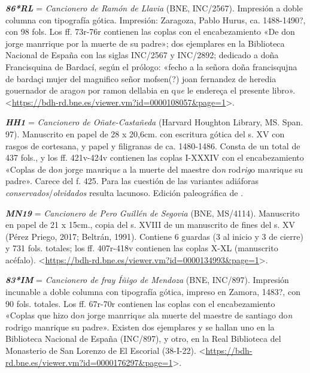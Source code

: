 \documentclass[11pt]{article}
\newcommand{\rl}{\emph{\textbf{86*RL}}}
\newcommand{\hh}{\emph{\textbf{HH1}}}
\newcommand{\mn}{\emph{\textbf{MN19}}}
\newcommand{\im}{\emph{\textbf{83*IM}}}
\newcommand{\comillas}[1]{«#1»}
\begin{document}
%
{\rl} = \emph{Cancionero de Ramón de Llavia} (BNE, INC/2567).
%
Impresión a doble columna con tipografía gótica. Impresión: Zaragoza, Pablo Hurus, ca. 1488-1490?, con 98 fols. Los ff. 73r-76r contienen las coplas con el encabezamiento \comillas{De don jorge manrrique por la muerte de su padre}; dos ejemplares en la Biblioteca Nacional de España con las siglas INC/2567 y INC/2892; dedicado a doña Francisquina de Bardací, según el prólogo: \comillas{fecho a la señora doña francisqujna de bardaçi mujer del magnifico señor mofsen(?) joan fernandez de heredia gouernador de arago\emph{n} por ramon dellabia en q\emph{ue} le endereça el presente libro}. <\url{https://bdh-rd.bne.es/viewer.vm?id=0000108057\&page=1}>.\par
%
{\hh} = \emph{Cancionero de Oñate-Castañeda} (Harvard Houghton Library, MS. Span. 97).
%
Manuscrito en papel de 28 x 20,6cm. con escritura gótica del s. XV con rasgos de cortesana, y papel y filigranas de ca. 1480-1486. Consta de un total de 437 fols., y los ff. 421v-424v contienen las coplas I-XXXIV con el encabezamiento \comillas{Coplas de do\emph{n} jorge ma\emph{n}riq\emph{ue} a la muerte del maestre do\emph{n} rod\emph{rig}o ma\emph{n}riq\emph{ue} su padre}. Carece del f. 425. Para las cuestión de las variantes adiáforas \emph{conservados}/\emph{olvidados} resulta lacunoso. Edición paleográfica de \textcite{Severin1990}.\par
%
{\mn} = \emph{Cancionero de Pero Guillén de Segovia} (BNE, MS/4114).
%
Manuscrito en papel de 21 x 15cm., copia del s. XVIII de un manuscrito de fines del s. XV (Pérez Priego, 2017; Beltrán, 1991). Contiene 6 guardas (3 al inicio y 3 de cierre) y 731 fols. totales; los ff. 407r-418v contienen las coplas X-XL (manuscrito acéfalo). <\url{https://bdh-rd.bne.es/viewer.vm?id=0000134993\&page=1}>.\par
%
{\im} = \emph{Cancionero de fray Íñigo de Mendoza} (BNE, INC/897).
%
Impresión incunable a doble columna con tipografía gótica, impreso en Zamora, 1483?, con 90 fols. totales. Los ff. 67r-70r contienen las coplas con el encabezamiento \comillas{Coplas que hizo do\emph{n} jorge manrriq\emph{ue} ala muerte del maestre de santiago do\emph{n} rodrigo manrique su padre}. Existen dos ejemplares y se hallan uno en la Biblioteca Nacional de España (INC/897), y otro, en la Real Biblioteca del Monasterio de San Lorenzo de El Escorial (38-I-22). <\url{https://bdh-rd.bne.es/viewer.vm?id=0000176297\&page=1}>.\par
%
\end{document}

